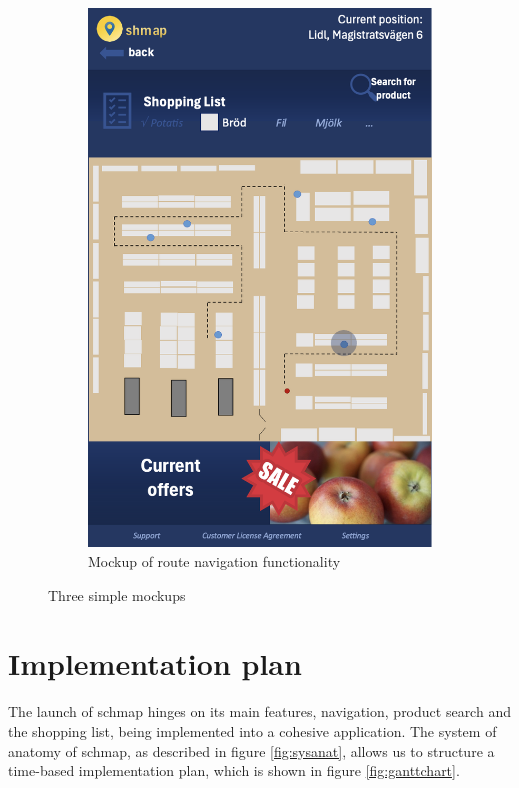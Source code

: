 \documentclass[titlepage]{article}
\begin{document}
\begin{figure}[h!]
\begin{subfigure}[b]{0.3\linewidth}
      \includegraphics[width=\textwidth]{ShopRoute.png}
    \caption{Mockup of route navigation functionality}
      \end{subfigure}
    \caption{Three simple mockups}
    \label{fig:mockups}
\end{figure}

\section{Implementation plan}

The launch of schmap hinges on its main features, navigation, product search and the shopping list, being implemented into a cohesive application. The system of anatomy of schmap, as described in figure \ref{fig:sysanat}, allows us to structure a time-based implementation plan, which is shown in figure \ref{fig:ganttchart}.
\end{document}
